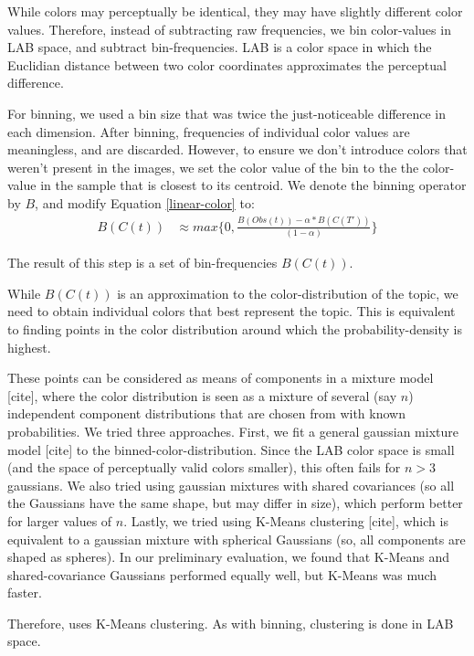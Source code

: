While colors may perceptually be identical, they may have slightly different color values. Therefore, instead of subtracting raw frequencies, we bin color-values in LAB space, and subtract bin-frequencies. LAB is a color space in which the Euclidian distance between two color coordinates approximates the perceptual difference. 

For binning, we used a bin size that was twice the just-noticeable difference in each dimension. After binning, frequencies of individual color values are meaningless, and are discarded. However, to ensure we don't introduce colors that weren't present in the images, we set the color value of the bin to the the color-value in the sample that is closest to its centroid. We denote the binning operator by $B$, and modify Equation \ref{linear-color} to:
\begin{align}
\label{linear-color-bin}  
B(C(t)) &\approx max\{0,\frac{B(Obs(t)) - \alpha*B(C(T'))}{(1-\alpha)}\}
\end{align}

The result of this step is a set of bin-frequencies $B(C(t))$.

While $B(C(t))$ is an approximation to the color-distribution of the topic, we need to obtain individual colors that best represent the topic. This is equivalent to finding points in the color distribution around which the probability-density is highest. 

These points can be considered as means of components in a mixture model [cite], where the color distribution is seen as a mixture of several (say $n$) independent component distributions  that are chosen from with known probabilities. We tried three approaches. First, we fit a general gaussian mixture model [cite] to the binned-color-distribution. Since the LAB color space is small (and the space of perceptually valid colors smaller), this often fails for $n>3$ gaussians. We also tried using gaussian mixtures with shared covariances (so all the Gaussians have the same shape, but may differ in size), which perform better for larger values of $n$. Lastly, we tried using K-Means clustering [cite], which is equivalent to a gaussian mixture with spherical Gaussians (so, all components are shaped as spheres). In our preliminary evaluation, we found that K-Means and shared-covariance Gaussians performed equally well, but K-Means was much faster. 

Therefore, \system uses K-Means clustering. As with binning, clustering is done in LAB space.


